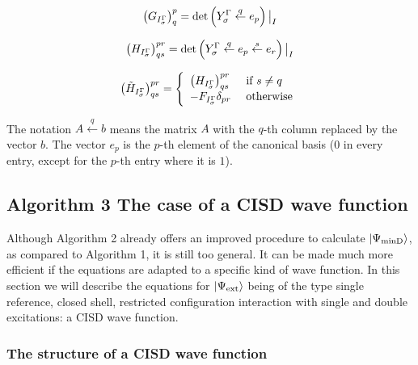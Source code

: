 \begin{equation}
  \big( G_{I_\sigma^{\Gamma}} \big)^p_q = \text{det} \left( Y_\sigma^{\Gamma} \overset{q}{\leftarrow} e_p \right) \big|_I
\end{equation}

\begin{equation}
  \big( H_{I_\sigma^{\Gamma}} \big)^{pr}_{qs} =
  \text{det} \left( Y_\sigma^{\Gamma} \overset{q}{\leftarrow} e_p
    \overset{s}{\leftarrow} e_r \right) \big|_I
\end{equation}

\begin{equation}
  \big( \tilde{H}_{I_\sigma^{\Gamma}} \big)^{pr}_{qs} =
  \left\{
    \begin{array}{ll}
      \big( H_{I_\sigma^{\Gamma}} \big)^{pr}_{qs} & \text{ if } s \ne q\\
      -F_{I_\sigma^{\Gamma}} \delta_{pr} & \text{ otherwise}
    \end{array}
  \right.
\end{equation}

The notation $A \overset{q}{\leftarrow}b$ means the matrix $A$ with the $q$-th column replaced by the vector $b$.
The vector $e_p$ is the $p$-th element of the canonical basis ($0$ in every entry, except for the $p
$-th entry where it is $1$).


\subsection{\textsf{\LARGE Algorithm 3} The case of a CISD wave function}

Although Algorithm 2 already offers an improved procedure to calculate $\ket{\Psi_\text{minD}}$, as compared to Algorithm 1, it is still too general.
It can be made much more efficient if the equations are adapted to a specific kind of wave function.
In this section we will describe the equations for $\ket{\Psi_\text{ext}}$ being of the type single reference, closed shell, restricted configuration interaction with single and double excitations: a CISD wave function.

\subsubsection{The structure of a CISD wave function}
\label{sec:struct_cisd_wf}

